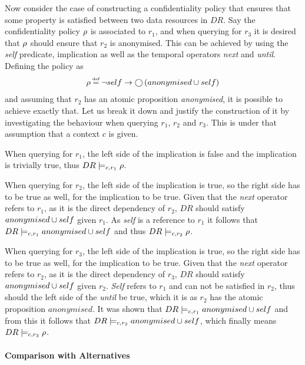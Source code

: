 \begin{example}
Now consider the case of constructing a confidentiality policy that ensures that some property is satisfied between two data resources in $DR$. Say the confidentiality policy $\rho$ is associated to $r_1$, and when querying for $r_3$ it is desired that $\rho$ should ensure that $r_2$ is anonymised. This can be achieved by using the \emph{self} predicate, implication as well as the temporal operators \emph{next} and \emph{until}. Defining the policy as 
\begin{align*}
    \conf \eqdef \lnot self \imply \X \left( anonymised \U self \right)
\end{align*}
and assuming that $r_2$ has an atomic proposition \emph{anonymised}, it is possible to achieve exactly that. Let us break it down and justify the construction of it by investigating the behaviour when querying $r_1$, $r_2$ and $r_3$. This is under that assumption that a context $c$ is given.

When querying for $r_1$, the left side of the implication is false and the implication is trivially true, thus $DR \models_{c,r_1} \rho$. 

When querying for $r_2$, the left side of the implication is true, so the right side has to be true as well, for the implication to be true. Given that the \emph{next} operator refers to $r_1$, as it is the direct dependency of $r_2$, $DR$ should satisfy $anonymised \cup self$ given $r_1$. As \emph{self} is a reference to $r_1$ it follows that $DR \models_{c,r_1} anonymised \cup self$ and thus $DR \models_{c,r_2} \rho$.

When querying for $r_3$, the left side of the implication is true, so the right side has to be true as well, for the implication to be true. Given that the \emph{next} operator refers to $r_2$, as it is the direct dependency of $r_3$, $DR$ should satisfy $anonymised \cup self$ given $r_2$. \emph{Self} refers to $r_1$ and can not be satisfied in $r_2$, thus should the left side of the \emph{until} be true, which it is as $r_2$ has the atomic proposition $anonymised$. It was shown that $DR \models_{c,r_1} anonymised \cup self$ and from this it follows that $DR \models_{c,r_2} anonymised \cup self$, which finally means $DR \models_{c,r_3} \rho$.
\end{example}

\paragraph{Comparison with Alternatives}
